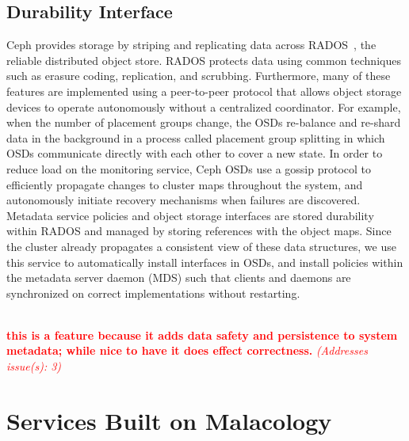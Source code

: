 \documentclass[preprint]{sigplanconf-eurosys}
\newcommand{\newcomment}[1]{{\textcolor{red}{\textbf{#1}}}}
\newcommand{\addressesissue}[1]{{\textcolor{red}{{\it (Addresses issue(s): {#1})}}}}
\begin{document}
\subsection{Durability Interface}
\label{sec:durability}

Ceph provides storage by striping and replicating data across
RADOS~\cite{weil_rados_2007}, the reliable distributed object store. RADOS
protects data using common techniques such as erasure
coding, replication, and scrubbing.  Furthermore, many of these features
are implemented using a peer-to-peer protocol that allows object storage
devices to operate autonomously without a centralized coordinator.  For
example, when the number of placement groups change, the OSDs re-balance and
re-shard data in the background in a process called placement group splitting
in which OSDs communicate directly with each other to cover a new state.
In order to reduce load on the monitoring service, Ceph OSDs use a gossip
protocol to efficiently propagate changes to cluster maps throughout the
system, and autonomously initiate recovery mechanisms when failures are
discovered.\\

 Metadata service policies and object storage
interfaces are stored durability within RADOS and managed by storing references
with the object maps. Since the cluster already propagates a consistent view of
these data structures, we use this service to automatically install interfaces
in OSDs, and install policies within the metadata server daemon (MDS) such that clients and daemons are
synchronized on correct implementations without restarting.

\newcomment{\\  this is a feature because it
adds data safety and persistence to system metadata; while nice to have it does
effect correctness.}
\addressesissue{3}

\section{Services Built on Malacology}
\label{sec:services}
\label{services-built-on-malacology}
\end{document}

